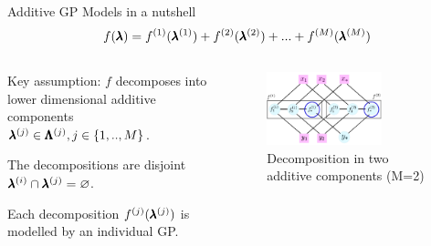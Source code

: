 \begin{frame}{Additive GP Models in a nutshell}
        \begin{equation*}
            f(\pmb{\lambda})=f^{(1)}(\pmb{\lambda}^{(1)})+f^{(2)}(\pmb{\lambda}^{(2)})+...+f^{(M)}(\pmb{\lambda}^{(M)})
        \end{equation*}
\begin{itemize}
\begin{columns}[T]
\begin{column}{0.45\linewidth}

\hspace{2em}
    \item Key assumption: $f$ decomposes into lower dimensional additive components $\pmb{\lambda}^{(j)} \in \pmb{\Lambda}^{(j)}, j \in \{1,..,M\}$.
    \pause
    \item The decompositions are disjoint $\pmb{\lambda}^{(i)} \cap \pmb{\lambda}^{(j)} = \varnothing$.
    \pause
    \item Each decomposition $f^{(j)}(\pmb{\lambda}^{(j)})$ is modelled by an individual GP.
    \pause
    \end{column}
    \begin{column}{0.45\linewidth}
        \begin{figure}
    \includegraphics[width=0.7\textwidth]{w06_hpo_bo/images/highdim_images/additive-models.png}
    \caption{Decomposition in two additive components (M=2)}
    \end{figure}
    \end{column}
\end{columns}
\end{itemize}
\end{frame}
